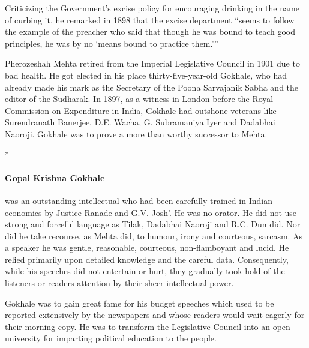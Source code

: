 \begin{multicols}{2}
Criticizing the Government's excise policy for encouraging drinking in the name of curbing it, he remarked in 1898 that the excise department ``seems to follow the example of the preacher who said that though he was bound to teach good principles, he was by no `means bound to practice them.'''

Pherozeshah Mehta retired from the Imperial Legislative Council in 1901 due to bad health. He got elected in his place thirty-five-year-old Gokhale, who had already made his mark as the Secretary of the Poona Sarvajanik Sabha and the editor of the Sudharak. In 1897, as a witness in London before the Royal Commission on Expenditure in India, Gokhale had outshone veterans like Surendranath Banerjee, D.E. Wacha, G. Subramaniya Iyer and Dadabhai Naoroji. Gokhale was to prove a more than worthy successor to Mehta.

\begin{center}*\end{center}

\paragraph{Gopal Krishna Gokhale} was an outstanding intellectual who had been carefully trained in Indian economics by Justice Ranade and G.V. Josh'. He was no orator. He did not use strong and forceful language as Tilak, Dadabhai Naoroji and R.C. Dun did. Nor did he take recourse, as Mehta did, to humour, irony and courteous, sarcasm. As a speaker he was gentle, reasonable, courteous, non-flamboyant and lucid. He relied primarily upon detailed knowledge and the careful data. Consequently, while his speeches did not entertain or hurt, they gradually took hold of the listeners or readers attention by their sheer intellectual power.

Gokhale was to gain great fame for his budget speeches which used to be reported extensively by the newspapers and whose readers would wait eagerly for their morning copy. He was to transform the Legislative Council into an open university for imparting political education to the people.


\end{multicols}
